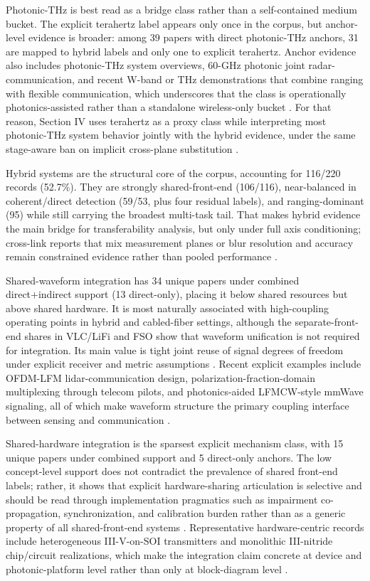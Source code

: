 \documentclass[letterpaper,journal]{IEEEtran}
\begin{document}
Photonic-THz is best read as a bridge class rather than a self-contained medium bucket. The explicit terahertz label appears only once in the corpus, but anchor-level evidence is broader: among 39 papers with direct photonic-THz anchors, 31 are mapped to hybrid labels and only one to explicit terahertz. Anchor evidence also includes photonic-THz system overviews, 60-GHz photonic joint radar-communication, and recent W-band or THz demonstrations that combine ranging with flexible communication, which underscores that the class is operationally photonics-assisted rather than a standalone wireless-only bucket . For that reason, Section IV uses terahertz as a proxy class while interpreting most photonic-THz system behavior jointly with the hybrid evidence, under the same stage-aware ban on implicit cross-plane substitution .

Hybrid systems are the structural core of the corpus, accounting for 116/220 records (52.7\%). They are strongly shared-front-end (106/116), near-balanced in coherent/direct detection (59/53, plus four residual labels), and ranging-dominant (95) while still carrying the broadest multi-task tail. That makes hybrid evidence the main bridge for transferability analysis, but only under full axis conditioning; cross-link reports that mix measurement planes or blur resolution and accuracy remain constrained evidence rather than pooled performance .

Shared-waveform integration has 34 unique papers under combined direct+indirect support (13 direct-only), placing it below shared resources but above shared hardware. It is most naturally associated with high-coupling operating points in hybrid and cabled-fiber settings, although the separate-front-end shares in VLC/LiFi and FSO show that waveform unification is not required for integration. Its main value is tight joint reuse of signal degrees of freedom under explicit receiver and metric assumptions .
Recent explicit examples include OFDM-LFM lidar-communication design, polarization-fraction-domain multiplexing through telecom pilots, and photonics-aided LFMCW-style mmWave signaling, all of which make waveform structure the primary coupling interface between sensing and communication .

Shared-hardware integration is the sparsest explicit mechanism class, with 15 unique papers under combined support and 5 direct-only anchors. The low concept-level support does not contradict the prevalence of shared front-end labels; rather, it shows that explicit hardware-sharing articulation is selective and should be read through implementation pragmatics such as impairment co-propagation, synchronization, and calibration burden rather than as a generic property of all shared-front-end systems .
Representative hardware-centric records include heterogeneous III-V-on-SOI transmitters and monolithic III-nitride chip/circuit realizations, which make the integration claim concrete at device and photonic-platform level rather than only at block-diagram level .
\end{document}
